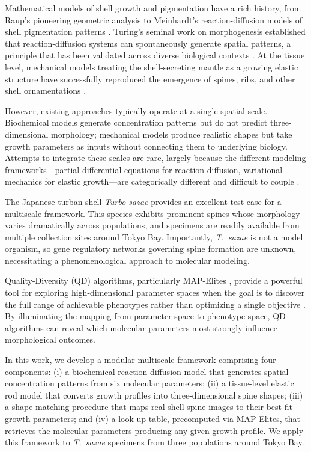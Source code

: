 \documentclass[11pt]{article}
\begin{document}
Mathematical models of shell growth and pigmentation have a rich history, from Raup's pioneering geometric analysis \citep{raup1966} to Meinhardt's reaction-diffusion models of shell pigmentation patterns \citep{meinhardt2009}. Turing's seminal work on morphogenesis \citep{turing1952} established that reaction-diffusion systems can spontaneously generate spatial patterns, a principle that has been validated across diverse biological contexts \citep{kondo2010, gierer1972}. At the tissue level, mechanical models treating the shell-secreting mantle as a growing elastic structure have successfully reproduced the emergence of spines, ribs, and other shell ornamentations \citep{chirat2013, moulton2012}.

However, existing approaches typically operate at a single spatial scale. Biochemical models generate concentration patterns but do not predict three-dimensional morphology; mechanical models produce realistic shapes but take growth parameters as inputs without connecting them to underlying biology. Attempts to integrate these scales are rare, largely because the different modeling frameworks---partial differential equations for reaction-diffusion, variational mechanics for elastic growth---are categorically different and difficult to couple \citep{moulton2020}.

The Japanese turban shell \textit{Turbo sazae} \citep{sasaki2017} provides an excellent test case for a multiscale framework. This species exhibits prominent spines whose morphology varies dramatically across populations, and specimens are readily available from multiple collection sites around Tokyo Bay. Importantly, \textit{T.\ sazae} is not a model organism, so gene regulatory networks governing spine formation are unknown, necessitating a phenomenological approach to molecular modeling.

Quality-Diversity (QD) algorithms, particularly MAP-Elites \citep{mouret2015}, provide a powerful tool for exploring high-dimensional parameter spaces when the goal is to discover the full range of achievable phenotypes rather than optimizing a single objective \citep{cossette2021}. By illuminating the mapping from parameter space to phenotype space, QD algorithms can reveal which molecular parameters most strongly influence morphological outcomes.

In this work, we develop a modular multiscale framework comprising four components: (i) a biochemical reaction-diffusion model that generates spatial concentration patterns from six molecular parameters; (ii) a tissue-level elastic rod model that converts growth profiles into three-dimensional spine shapes; (iii) a shape-matching procedure that maps real shell spine images to their best-fit growth parameters; and (iv) a look-up table, precomputed via MAP-Elites, that retrieves the molecular parameters producing any given growth profile. We apply this framework to \textit{T.\ sazae} specimens from three populations around Tokyo Bay.
\end{document}
